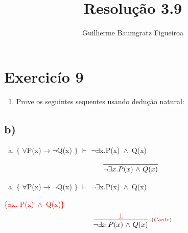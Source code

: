 \documentclass[aspectratio=43]{beamer}
\title[\sc{Resolu\c c\~ao}]{Resolu\c c\~ao 3.9}
\author[Guilherme Baumgratz Figueiroa]{Guilherme Baumgratz Figueiroa}
\institute[UFOP]{Universidade Federal de Ouro Preto} %
\date{}
\newcommand{\ria}{$\rightarrow$}
\newcommand{\fall}{$\forall$}
\newcommand{\ex}{$\exists$}
\newcommand{\nao}{$\neg$}
\newcommand{\nex}{\nao\ex}
\newcommand{\andd}{$\wedge$}
\begin{document}
	
	\begin{frame}
		\titlepage
	\end{frame}
	
	\section{Exercic\'io 9}
	
	\begin{frame}%
    
    	\begin{enumerate}[1.]
			\item Prove os seguintes sequentes usando dedu\c c\~ao natural: \\
		\end{enumerate}
				
	\end{frame}
    \subsection{b)}
    
	\begin{frame}[fragile]
    	
    	\begin{enumerate}[b)]
			
			\item $\{$ \fall P(x)\ria \nao Q(x) $\}$ $\vdash$ \nex  x.P(x)\ \andd\ Q(x) \\ 
			
		\end{enumerate}
        \vspace{100pt}
        \[
        \begin{array}{c}
		
        	\infer[_{}]
            {$\nex$  x. P(x)\ $\andd$\ Q(x)}
            {}
        
		\end{array}
        \]
        
	\end{frame}
    
    \begin{frame}[fragile]
    	
    	\begin{enumerate}[b)]
			
			\item $\{$ \fall P(x)\ria \nao Q(x) $\}$ $\vdash$ \nex  x.P(x)\ \andd\ Q(x) \\ 
			
		\end{enumerate}
        \textcolor{red}{\{\ex  x. P(x)\ \andd\ Q(x)\}}
        \vspace{95pt}
        \[
        \begin{array}{c}
		
        	\infer[_{(\textcolor{red}{Contr})}]
            {$\nex$  x. P(x)\ $\andd$\ Q(x)}
            {\textcolor{red}{\bot}}
        
		\end{array}
        \]
        
	\end{frame}
    
\end{document}
